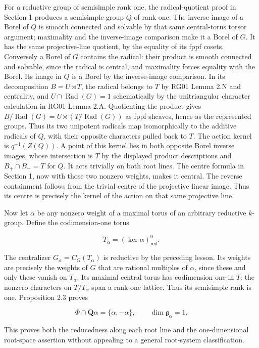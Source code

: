 \documentclass[11pt,a4paper,openany]{report}
\begin{document}
For a reductive group of semisimple rank one, the radical-quotient proof in Section 1 produces a semisimple group \(Q\) of rank one. The inverse image of a Borel of \(Q\) is smooth connected and solvable by that same central-torus torsor argument; maximality and the inverse-image comparison make it a Borel of \(G\). It has the same projective-line quotient, by the equality of its fppf cosets. Conversely a Borel of \(G\) contains the radical: their product is smooth connected and solvable, since the radical is central, and maximality forces equality with the Borel. Its image in \(Q\) is a Borel by the inverse-image comparison. In its decomposition \(B=U\rtimes T\), the radical belongs to \(T\) by RG01 Lemma 2.N and centrality, and \(U\cap\operatorname{Rad}(G)=1\) schematically by the unitriangular character calculation in RG01 Lemma 2.A. Quotienting the product gives \(B/\operatorname{Rad}(G)=U\rtimes(T/\operatorname{Rad}(G))\) as fppf sheaves, hence as the represented groups. Thus its two unipotent radicals map isomorphically to the additive radicals of \(Q\), with their opposite characters pulled back to \(T\). The action kernel is \(q^{-1}(Z(Q))\). A point of this kernel lies in both opposite Borel inverse images, whose intersection is \(T\) by the displayed product descriptions and \(B_+\cap B_-=T\) for \(Q\). It acts trivially on both root lines. The centre formula in Section 1, now with those two nonzero weights, makes it central. The reverse containment follows from the trivial centre of the projective linear image. Thus its centre is precisely the kernel of the action on that same projective line.

Now let \(\alpha\) be any nonzero weight of a maximal torus of an arbitrary reductive \(k\)-group. Define the codimension-one torus

\[
T_\alpha=(\ker\alpha)^0_{\mathrm{red}}.
\]

The centralizer \(G_\alpha=C_G(T_\alpha)\) is reductive by the preceding lesson. Its weights are precisely the weights of \(G\) that are rational multiples of \(\alpha\), since these and only these vanish on \(T_\alpha\). Its maximal central torus has codimension one in \(T\): the nonzero characters on \(T/T_\alpha\) span a rank-one lattice. Thus its semisimple rank is one. Proposition 2.3 proves

\[
\Phi\cap\mathbf Q\alpha=\{\alpha,-\alpha\},\qquad
\dim\mathfrak g_\alpha=1.
\]

This proves both the reducedness along each root line and the one-dimensional root-space assertion without appealing to a general root-system classification.
\end{document}
